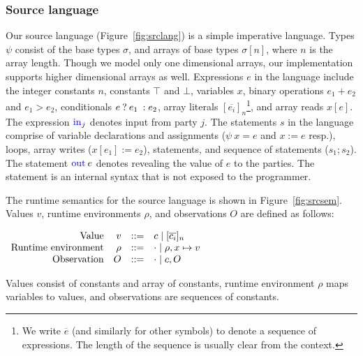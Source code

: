 \subsubsection*{Source language}Our source language
(Figure~\ref{fig:srclang}) is a simple imperative language. Types
$\psi$ consist of the base types $\sigma$, and arrays
of base types $\sigma[n]$, where $n$ is the array length. Though we
model only one dimensional arrays, our implementation supports higher
dimensional arrays as well. Expressions $e$ in the language include the
integer constants $n$,  constants $\top$ and $\bot$,
variables $x$, binary operations $e_{1} + e_{2}$ and $e_{1} > e_{2}$,
conditionals ${{e}\:?\:{e_{1}}\::{e_{2}}}$, array literals 
$[\overline{e_{i}}]_{n}$\footnote{We write $\overline{e}$ (and
  similarly for other symbols) to denote a sequence of expressions.
The length of the sequence is usually clear from the context.}, and
array reads $x[e]$. The expression $\kw{in}_{j}$ denotes input from
party $j$. The statements $s$ in the language comprise of variable
declarations and assignments ($\psi\:x = e$ and $x := e$ resp.),
 loops, array writes ($x[e_{1}] := e_{2}$), 
statements, and sequence of statements ($s_{1}; s_{2}$). The statement
$\kw{out}\:e$ denotes revealing the value of $e$ to the
parties. The  statement is an internal syntax that is not
exposed to the programmer.

The runtime semantics for the source language is shown in
Figure~\ref{fig:srcsem}. Values $v$, runtime environments $\rho$, and
observations $O$ are defined as follows:

\vspace{0.2cm}
$
\small
\begin{array}{rrcl}
    \ftext{Value} & v &::=& c \mid [\overline{c_{i}}]_{n}\\
    \ftext{Runtime environment} & \rho &::=& \cdot \mid \rho,x \mapsto v\\
    \ftext{Observation} & O & ::= & \cdot \mid c, O \\
\end{array}
$

\vspace{0.2cm}
Values consist of constants and array of constants, runtime environment
$\rho$ maps variables to values, and observations are sequences of
constants.

